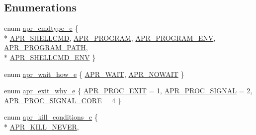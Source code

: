 \subsection*{Enumerations}
\begin{DoxyCompactItemize}
\item 
enum \hyperlink{group__apr__thread__proc_gadcb981d7748c580eb69ac11dbf709060}{apr\+\_\+cmdtype\+\_\+e} \{ \\*
\hyperlink{group__apr__thread__proc_ggadcb981d7748c580eb69ac11dbf709060a02f5d83f79e2c12bfca5a86d7f14caa6}{A\+P\+R\+\_\+\+S\+H\+E\+L\+L\+C\+MD}, 
\hyperlink{group__apr__thread__proc_ggadcb981d7748c580eb69ac11dbf709060ac128c1239a524cf21300b8ed6248ac99}{A\+P\+R\+\_\+\+P\+R\+O\+G\+R\+AM}, 
\hyperlink{group__apr__thread__proc_ggadcb981d7748c580eb69ac11dbf709060a6a3f9694aced0e449f6bb4b3e437233a}{A\+P\+R\+\_\+\+P\+R\+O\+G\+R\+A\+M\+\_\+\+E\+NV}, 
\hyperlink{group__apr__thread__proc_ggadcb981d7748c580eb69ac11dbf709060aa424b51bdc16e4d18bb757a32c6a346a}{A\+P\+R\+\_\+\+P\+R\+O\+G\+R\+A\+M\+\_\+\+P\+A\+TH}, 
\\*
\hyperlink{group__apr__thread__proc_ggadcb981d7748c580eb69ac11dbf709060afcefc45317b67fad6dc5459772ce9409}{A\+P\+R\+\_\+\+S\+H\+E\+L\+L\+C\+M\+D\+\_\+\+E\+NV}
 \}
\item 
enum \hyperlink{group__apr__thread__proc_ga5e52d786644f3b66d6180571e68c7260}{apr\+\_\+wait\+\_\+how\+\_\+e} \{ \hyperlink{group__apr__thread__proc_gga5e52d786644f3b66d6180571e68c7260a057885ccf4b8b707e0d115c691037de4}{A\+P\+R\+\_\+\+W\+A\+IT}, 
\hyperlink{group__apr__thread__proc_gga5e52d786644f3b66d6180571e68c7260a0163031f6b72b0c4add9108052a672d5}{A\+P\+R\+\_\+\+N\+O\+W\+A\+IT}
 \}
\item 
enum \hyperlink{group__apr__thread__proc_gac097b4fa41e67024711c5983446d0951}{apr\+\_\+exit\+\_\+why\+\_\+e} \{ \hyperlink{group__apr__thread__proc_ggac097b4fa41e67024711c5983446d0951a977f140c82333af62aa4bed8c99a3ee2}{A\+P\+R\+\_\+\+P\+R\+O\+C\+\_\+\+E\+X\+IT} = 1, 
\hyperlink{group__apr__thread__proc_ggac097b4fa41e67024711c5983446d0951a7e3421d18abe458ca27822d19424225b}{A\+P\+R\+\_\+\+P\+R\+O\+C\+\_\+\+S\+I\+G\+N\+AL} = 2, 
\hyperlink{group__apr__thread__proc_ggac097b4fa41e67024711c5983446d0951a6b667be4983cb59e9bed37ee05a0dcce}{A\+P\+R\+\_\+\+P\+R\+O\+C\+\_\+\+S\+I\+G\+N\+A\+L\+\_\+\+C\+O\+RE} = 4
 \}
\item 
enum \hyperlink{group__apr__thread__proc_ga3eaec78633742e7e0cb9480a21477aff}{apr\+\_\+kill\+\_\+conditions\+\_\+e} \{ \\*
\hyperlink{group__apr__thread__proc_gga3eaec78633742e7e0cb9480a21477affa33580ab0809e9498855fbdde8a1714ef}{A\+P\+R\+\_\+\+K\+I\+L\+L\+\_\+\+N\+E\+V\+ER}, 

\end{DoxyCompactItemize}
